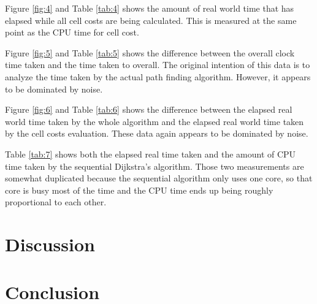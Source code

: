 \documentclass{article}
\begin{document}
Figure \ref{fig:4} and Table \ref{tab:4} shows the amount of real world time that has elapsed while
all cell costs are being calculated. This is measured at the same point as the CPU time for cell
cost.

Figure \ref{fig:5} and Table \ref{tab:5} shows the difference between the overall clock time taken
and the time taken to overall. The original intention of this data is to analyze the time taken by
the actual path finding algorithm. However, it appears to be dominated by noise.

Figure \ref{fig:6} and Table \ref{tab:6} shows the difference between the elapsed real world time
taken by the whole algorithm and the elapsed real world time taken by the cell costs evaluation.
These data again appears to be dominated by noise.

Table \ref{tab:7} shows both the elapsed real time taken and the amount of CPU time taken by the
sequential Dijkstra's algorithm. Those two measurements are somewhat duplicated because the
sequential algorithm only uses one core, so that core is busy most of the time and the CPU time ends
up being roughly proportional to each other.

\section*{Discussion}


\section*{Conclusion}

\printbibliography
\end{document}
